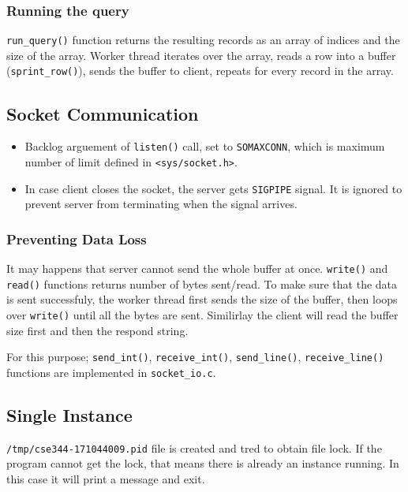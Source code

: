 \documentclass[a4paper]{article}
\begin{document}
\subsubsection*{Running the query}
\label{sec:org88a1620}
\texttt{run\_query()} function returns the resulting records as an array of indices and the size of the array. Worker thread iterates over the array, reads a row into a buffer (\texttt{sprint\_row()}), sends the buffer to client, repeats for every record in the array.

\subsection*{Socket Communication}
\label{sec:orgeca1b0a}
\begin{itemize}
\item Backlog arguement of \texttt{listen()} call, set to \texttt{SOMAXCONN}, which is maximum number of limit defined in \texttt{<sys/socket.h>}.
\item In case client closes the socket, the server gets \texttt{SIGPIPE} signal. It is ignored to prevent server from terminating when the signal arrives.
\end{itemize}

\subsubsection*{Preventing Data Loss}
\label{sec:org88c46eb}
It may happens that server cannot send the whole buffer at once. \texttt{write()} and \texttt{read()} functions returns number of bytes sent/read. To make sure that the data is sent successfuly, the worker thread first sends the size of the buffer, then loops over \texttt{write()} until all the bytes are sent. Similirlay the client will read the buffer size first and then the respond string.

For this purpose; \texttt{send\_int()}, \texttt{receive\_int()}, \texttt{send\_line()}, \texttt{receive\_line()} functions are implemented in \texttt{socket\_io.c}.

\subsection*{Single Instance}
\label{sec:org9c1e540}
\texttt{/tmp/cse344-171044009.pid} file is created and tred to obtain file lock. If the program cannot get the lock, that means there is already an instance running. In this case it will print a message and exit.
\end{document}
